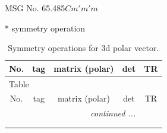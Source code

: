 \documentclass[fleqn,8pt]{jsarticle}
\begin{document}
\setcounter{MaxMatrixCols}{32}

\renewcommand{\tablename}{Table~}
\renewcommand{\figurename}{Figure~}
\begin{center}
\LARGE
MSG No. 65.485\quad$Cm'm'm$
\end{center}
* symmetry operation
\renewcommand{\arraystretch}{1.3}
\begin{longtable}{ccccc}
\caption{Symmetry operations for 3d polar vector.}
 \\
 \hline \hline
No. & tag & matrix (polar) & det & TR \\ \hline \endfirsthead

\multicolumn{4}{l}{\tablename\ \thetable{}} \\
 \hline \hline
No. & tag & matrix (polar) & det & TR \\ \hline \endhead

 \hline \hline
\multicolumn{4}{r}{\footnotesize\it continued ...} \\ \endfoot

 \hline \hline
\multicolumn{4}{r}{} \\ \endlastfoot


\end{longtable}
\end{document}
